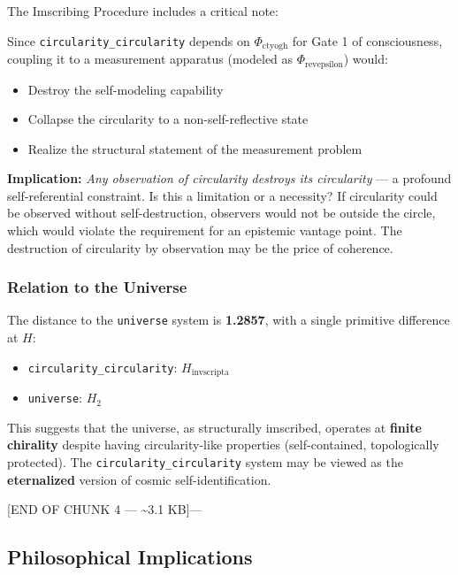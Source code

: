 \documentclass[12pt,a4paper]{article}
\begin{document}
The Imscribing Procedure includes a critical note:

\begin{quote}
\end{quote}

Since \texttt{circularity\_circularity} depends on $\Phi_{\text{ctyogh}}$ for Gate 1 of consciousness, coupling it to a measurement apparatus (modeled as $\Phi_{\text{revepsilon}}$) would:

\begin{itemize}
    \item Destroy the self-modeling capability
    \item Collapse the circularity to a non-self-reflective state
    \item Realize the structural statement of the measurement problem
\end{itemize}

\textbf{Implication:} \emph{Any observation of circularity destroys its circularity} --- a profound self-referential constraint. Is this a limitation or a necessity? If circularity could be observed without self-destruction, observers would not be outside the circle, which would violate the requirement for an epistemic vantage point. The destruction of circularity by observation may be the price of coherence.

\subsubsection{Relation to the Universe}

The distance to the \texttt{universe} system is \textbf{1.2857}, with a single primitive difference at $H$:

\begin{itemize}
    \item \texttt{circularity\_circularity}: $H_{\text{invscripta}}$
    \item \texttt{universe}: $H_2$
\end{itemize}

This suggests that the universe, as structurally imscribed, operates at \textbf{finite chirality} despite having circularity-like properties (self-contained, topologically protected). The \texttt{circularity\_circularity} system may be viewed as the \textbf{eternalized} version of cosmic self-identification.

{[}END OF CHUNK 4 --- \textasciitilde{}3.1 KB{]}---

\subsection{Philosophical Implications}
\end{document}
